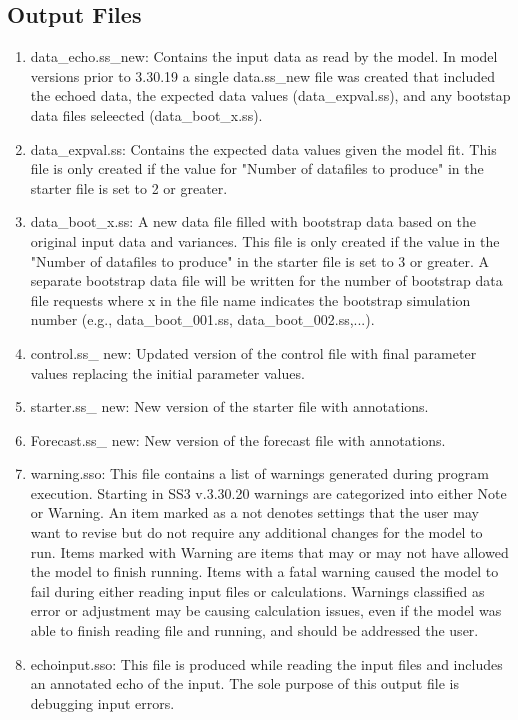	\subsection{Output Files}
	\begin{enumerate}
		\item data\_echo.ss\_new: Contains the input data as read by the model. In model versions prior to 3.30.19 a single data.ss\_new file was created that included the echoed data, the expected data values (data\_expval.ss), and any bootstap data files seleected (data\_boot\_x.ss).
		\item data\_expval.ss: Contains the expected data values given the model fit. This file is only created if the value for "Number of datafiles to produce" in the starter file is set to 2 or greater.
		\item data\_boot\_x.ss: A new data file filled with bootstrap data based on the original input data and variances. This file is only created if the value in the "Number of datafiles to produce" in the starter file is set to 3 or greater. A separate bootstrap data file will be written for the number of bootstrap data file requests where x in the file name indicates the bootstrap simulation number (e.g., data\_boot\_001.ss, data\_boot\_002.ss,...).
		\item control.ss\_ new: Updated version of the control file with final parameter values replacing the initial parameter values.
		\item starter.ss\_ new: New version of the starter file with annotations.
		\item Forecast.ss\_ new: New version of the forecast file with annotations.
		\item warning.sso: This file contains a list of warnings generated during program execution. Starting in SS3 v.3.30.20 warnings are categorized into either Note or Warning. An item marked as a not denotes settings that the user may want to revise but do not require any additional changes for the model to run. Items marked with Warning are items that may or may not have allowed the model to finish running. Items with a fatal warning caused the model to fail during either reading input files or calculations. Warnings classified as error or adjustment may be causing calculation issues, even if the model was able to finish reading file and running, and should be addressed the user. 
		\item echoinput.sso: This file is produced while reading the input files and includes an annotated echo of the input. The sole purpose of this output file is debugging input errors.

\end{enumerate}
